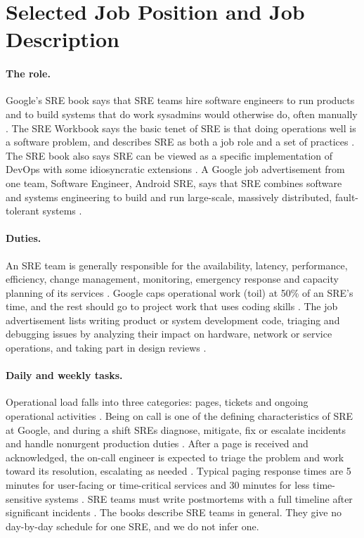 \section{Selected Job Position and Job Description}
\newcommand{\jobad}{google-about-careers-applications-jobs-results-121141635160384198-software-engineer-android-sre}

\paragraph{The role.}
Google's SRE book says that SRE teams hire software engineers to run products and to build systems that do work sysadmins would otherwise do, often manually \cite{sre-book}. The SRE Workbook says the basic tenet of SRE is that doing operations well is a software problem, and describes SRE as both a job role and a set of practices \cite{workbook}. The SRE book also says SRE can be viewed as a specific implementation of DevOps with some idiosyncratic extensions \cite{sre-book}. A Google job advertisement from one team, Software Engineer, Android SRE, says that SRE combines software and systems engineering to build and run large-scale, massively distributed, fault-tolerant systems \cite{\jobad}.

\paragraph{Duties.}
An SRE team is generally responsible for the availability, latency, performance, efficiency, change management, monitoring, emergency response and capacity planning of its services \cite{sre-book,workbook}. Google caps operational work (toil) at 50\% of an SRE's time, and the rest should go to project work that uses coding skills \cite{sre-book}. The job advertisement lists writing product or system development code, triaging and debugging issues by analyzing their impact on hardware, network or service operations, and taking part in design reviews \cite{\jobad}.

\paragraph{Daily and weekly tasks.}
Operational load falls into three categories: pages, tickets and ongoing operational activities \cite{sre-book}. Being on call is one of the defining characteristics of SRE at Google, and during a shift SREs diagnose, mitigate, fix or escalate incidents and handle nonurgent production duties \cite{workbook}. After a page is received and acknowledged, the on-call engineer is expected to triage the problem and work toward its resolution, escalating as needed \cite{sre-book}. Typical paging response times are 5 minutes for user-facing or time-critical services and 30 minutes for less time-sensitive systems \cite{sre-book}. SRE teams must write postmortems with a full timeline after significant incidents \cite{sre-book}. The books describe SRE teams in general. They give no day-by-day schedule for one SRE, and we do not infer one.

